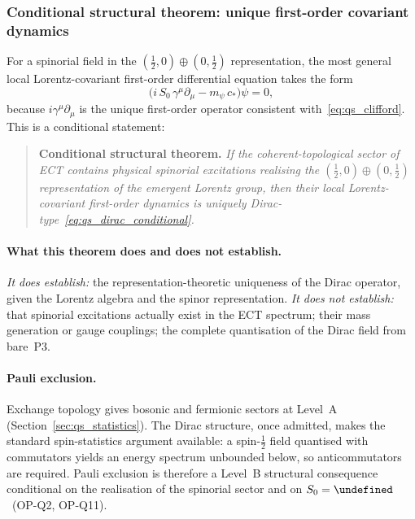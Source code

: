\documentclass[11pt,a4paper]{article}
\let\hbar\undefined
\numberwithin{equation}{section}
\begin{document}
\subsubsection*{Conditional structural theorem: unique first-order covariant dynamics}

For a spinorial field in the $(\tfrac{1}{2},0)\oplus(0,\tfrac{1}{2})$
representation, the most general local Lorentz-covariant first-order
differential equation takes the form
\begin{equation}
  \label{eq:qs_dirac_conditional}
  \bigl(i\,S_0\,\gamma^\mu\partial_\mu - m_\psi\,c_*\bigr)\psi = 0,
\end{equation}
because $i\gamma^\mu\partial_\mu$ is the unique first-order operator
consistent with~\eqref{eq:qs_clifford}.
This is a conditional statement:
\begin{quote}
\textbf{Conditional structural theorem.}
\textit{If the coherent-topological sector of ECT contains physical
spinorial excitations realising the
$(\frac{1}{2},0)\oplus(0,\frac{1}{2})$ representation of the
emergent Lorentz group, then their local Lorentz-covariant
first-order dynamics is uniquely Dirac-type~\eqref{eq:qs_dirac_conditional}.}
\end{quote}

\paragraph{What this theorem does and does not establish.}
\textit{It does establish:} the representation-theoretic uniqueness
of the Dirac operator, given the Lorentz algebra and the spinor
representation.
\textit{It does not establish:} that spinorial excitations actually
exist in the ECT spectrum; their mass generation or gauge couplings;
the complete quantisation of the Dirac field from bare~P3.

\paragraph{Pauli exclusion.}
Exchange topology gives bosonic and fermionic sectors at Level~A
(Section~\ref{sec:qs_statistics}).
The Dirac structure, once admitted, makes the standard spin-statistics
argument available: a spin-$\tfrac{1}{2}$ field quantised with
commutators yields an energy spectrum unbounded below, so
anticommutators are required.
Pauli exclusion is therefore a Level~B structural consequence
conditional on the realisation of the spinorial sector and on
$S_0=\hbar$~(OP-Q2, OP-Q11).
\end{document}
